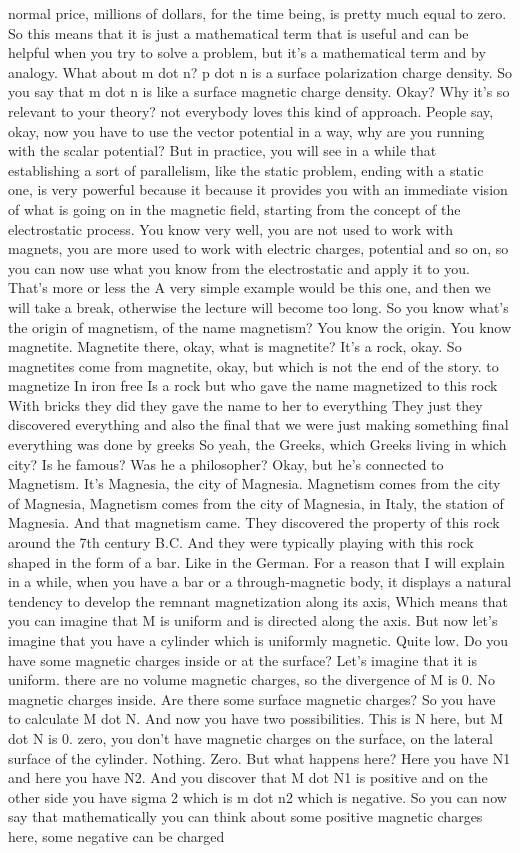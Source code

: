 normal price, millions of dollars, for the time being, is pretty much equal to zero. So this means that it is just a mathematical term that is useful and can be helpful when you try to solve a problem, but it's a mathematical term and by analogy. What about m dot n? p dot n is a surface polarization charge density. So you say that m dot n is like a surface magnetic charge density. Okay? Why it's so relevant to your theory? not everybody loves this kind of approach. People say, okay, now you have to use the vector potential in a way, why are you running with the scalar potential? But in practice, you will see in a while that establishing a sort of parallelism, like the static problem, ending with a static one, is very powerful because it because it provides you with an immediate vision of what is going on in the magnetic field, starting from the concept of the electrostatic process. You know very well, you are not used to work with magnets, you are more used to work with electric charges, potential and so on, so you can now use what you know from the electrostatic and apply it to you. That's more or less the A very simple example would be this one, and then we will take a break, otherwise the lecture will become too long. So you know what's the origin of magnetism, of the name magnetism? You know the origin. You know magnetite. Magnetite there, okay, what is magnetite? It's a rock, okay. So magnetites come from magnetite, okay, but which is not the end of the story. to magnetize In iron free Is a rock but who gave the name magnetized to this rock With bricks they did they gave the name to her to everything They just they discovered everything and also the final that we were just making something final everything was done by greeks So yeah, the Greeks, which Greeks living in which city? Is he famous? Was he a philosopher? Okay, but he's connected to Magnetism. It's Magnesia, the city of Magnesia. Magnetism comes from the city of Magnesia, Magnetism comes from the city of Magnesia, in Italy, the station of Magnesia. And that magnetism came. They discovered the property of this rock around the 7th century B.C. And they were typically playing with this rock shaped in the form of a bar. Like in the German. For a reason that I will explain in a while, when you have a bar or a through-magnetic body, it displays a natural tendency to develop the remnant magnetization along its axis, Which means that you can imagine that M is uniform and is directed along the axis. But now let's imagine that you have a cylinder which is uniformly magnetic. Quite low. Do you have some magnetic charges inside or at the surface? Let's imagine that it is uniform. there are no volume magnetic charges, so the divergence of M is 0. No magnetic charges inside. Are there some surface magnetic charges? So you have to calculate M dot N. And now you have two possibilities. This is N here, but M dot N is 0. zero, you don't have magnetic charges on the surface, on the lateral surface of the cylinder. Nothing. Zero. But what happens here? Here you have N1 and here you have N2. And you discover that M dot N1 is positive and on the other side you have sigma 2 which is m dot n2 which is negative. So you can now say that mathematically you can think about some positive magnetic charges here, some negative can be charged 